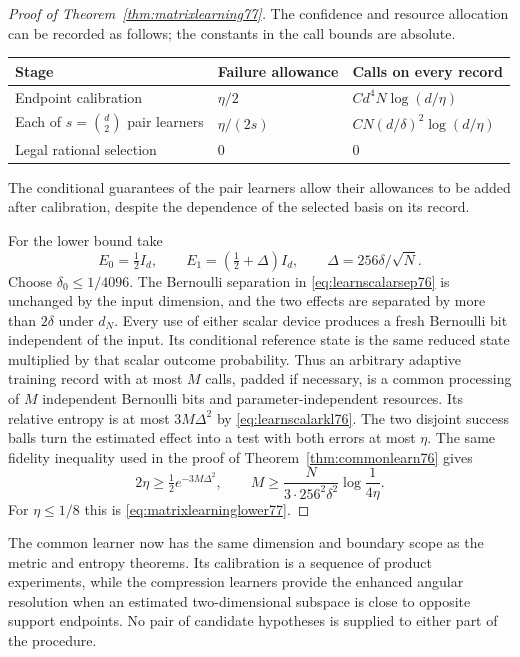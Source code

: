 \begin{proof}[Proof of Theorem~\ref{thm:matrixlearning77}]
The confidence and resource allocation can be recorded as follows;
the constants in the call bounds are absolute.
\begin{center}
\begin{tabular}{lll}
\hline
Stage & Failure allowance & Calls on every record\\
\hline
Endpoint calibration & $\eta/2$
    & $Cd^4N\log(d/\eta)$\\
Each of $s=\binom d2$ pair learners & $\eta/(2s)$
    & $CN(d/\delta)^2\log(d/\eta)$\\
Legal rational selection & $0$ & $0$\\
\hline
\end{tabular}
\end{center}
The conditional guarantees of the pair learners allow their
allowances to be added after calibration, despite the dependence of
the selected basis on its record.

For the lower bound take
\[
 E_0=\tfrac12I_d,\qquad
 E_1=(\tfrac12+\Delta)I_d,
 \qquad \Delta=256\delta/\sqrt N.
\]
Choose $\delta_0\le1/4096$.  The Bernoulli separation in
\eqref{eq:learnscalarsep76} is unchanged by the input dimension,
and the two effects are separated by more than $2\delta$ under
$d_N$.  Every use of either scalar device produces a fresh
Bernoulli bit independent of the input.  Its conditional reference
state is the same reduced state multiplied by that scalar outcome
probability.  Thus an arbitrary adaptive training record with at
most $M$ calls, padded if necessary, is a common processing of
$M$ independent Bernoulli bits and parameter-independent
resources.  Its relative entropy is at most $3M\Delta^2$ by
\eqref{eq:learnscalarkl76}.  The two disjoint success balls turn
the estimated effect into a test with both errors at most $\eta$.
The same fidelity inequality used in the proof of
Theorem~\ref{thm:commonlearn76} gives
\[
 2\eta\ge\tfrac12e^{-3M\Delta^2},\qquad
 M\ge\frac{N}{3\cdot256^2\delta^2}\log\frac1{4\eta}.
\]
For $\eta\le1/8$ this is
\eqref{eq:matrixlearninglower77}.
\end{proof}

The common learner now has the same dimension and boundary scope
as the metric and entropy theorems.  Its calibration is a sequence
of product experiments, while the compression learners provide the
enhanced angular resolution when an estimated two-dimensional
subspace is close to opposite support endpoints.  No pair of
candidate hypotheses is supplied to either part of the procedure.
